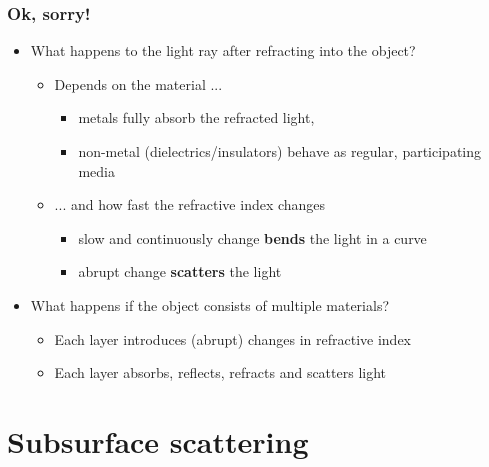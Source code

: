 \documentclass{f4_beamer_metropolis}
\begin{document}
\begin{frame}[t]
  \frametitle{Ok, sorry!}
  \begin{itemize}
    \item What happens to the light ray after refracting into the object?
    \begin{itemize}
      \item Depends on the material ...
      \begin{itemize}
        \item metals fully absorb the refracted light,
        \item non-metal (dielectrics/insulators) behave as regular, participating media
      \end{itemize}
      \item ... and how fast the refractive index changes
      \begin{itemize}
        \item slow and continuously change \textbf{bends} the light in a curve
        \item abrupt change \textbf{scatters} the light
      \end{itemize}
    \end{itemize}
    \item What happens if the object consists of multiple materials?
      \begin{itemize}
        \item Each layer introduces (abrupt) changes in refractive index
        \item Each layer absorbs, reflects, refracts and scatters light
      \end{itemize}
  \end{itemize}

\end{frame}

\section{Subsurface scattering}
\label{sec:subsurface}
\end{document}
